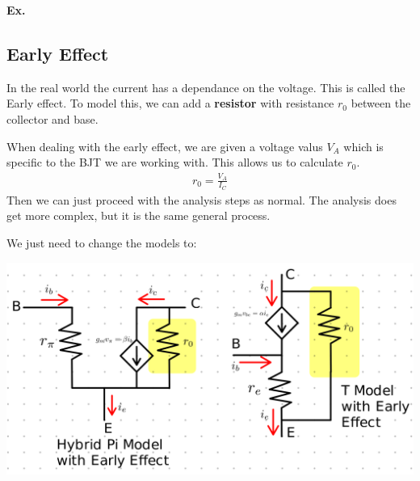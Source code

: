 \documentclass[12pt,letterpaper]{article} \usepackage{amsmath} \usepackage{graphicx} \usepackage[margin=1in]{geometry} \usepackage{longtable}  \usepackage{amssymb}
\begin{document}
	\begin{mdframed}
		\textbf{Ex. }
	\end{mdframed}
	
	\subsection{Early Effect}
	In the real world the current has a dependance on the voltage. This is called the Early effect. To model this, we can add a \textbf{resistor} with resistance $r_0$ between the collector and base. 
	
	When dealing with the early effect, we are given a voltage valus $V_A$ which is specific to the BJT we are working with. This allows us to calculate $r_0$. 
	\begin{align*}
		r_0 = \frac{V_A}{I_C}
	\end{align*}
	Then we can just proceed with the analysis steps as normal. The analysis does get more complex, but it is the same general process. 
	
	We just need to change the models to:
	\begin{center}
		\includegraphics[width=0.8\linewidth]{hybridpi-tmodel-w-early}
	\end{center}
	
\end{document}
